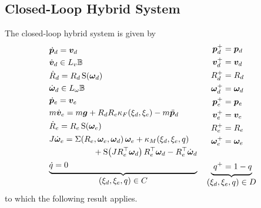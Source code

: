 \documentclass[journal]{IEEEtran}
\newcommand{\ball}{\mathbb{B}}
\begin{document}
\subsection{Closed-Loop Hybrid System}
The closed-loop hybrid system is given by
\begin{equation}\label{eq:H}
\begin{aligned}
\underbrace{%
\begin{aligned}
&\dot{\bm{p}}_d = \bm{v}_d\\
&\dot{\bm{v}}_d \in L_v\ball\\
&\dot{R}_d = R_d \operatorname{S}(\bm{\omega}_d)\\
&\dot{\bm{\omega}}_d \in L_\omega\ball\\
&\dot{\bm{p}}_e = \bm{v}_e\\
&m\dot{\bm{v}}_e = m\bm{g} + R_d R_e \kappa_F(\xi_d,\xi_e) - m\ddot{\bm{p}}_d\\
&\dot{R}_e = R_e \operatorname{S}(\bm{\omega}_e)\\
&\begin{multlined}
J\dot{\bm{\omega}}_e
= \Sigma(R_e,\bm{\omega}_e,\bm{\omega}_d)\,\bm{\omega}_e + \kappa_M(\xi_d,\xi_e,q) \\
+ \operatorname{S}\!\big(J R_e^\top \bm{\omega}_d\big)\,R_e^\top \bm{\omega}_d
- R_e^\top \dot{\bm{\omega}}_d
\end{multlined}\\
&\dot{q} = 0
\end{aligned}}_{\displaystyle(\xi_d,\xi_e,q)\in C}
\quad
\underbrace{%
\begin{aligned}
\bm{p}_d^{+} &= \bm{p}_d\\
\bm{v}_d^{+} &= \bm{v}_d\\
R_d^{+} &= R_d\\
\bm{\omega}_d^{+} &= \bm{\omega}_d\\
\bm{p}_e^{+} &= \bm{p}_e\\
\bm{v}_e^{+} &= \bm{v}_e\\
R_e^{+} &= R_e\\
\bm{\omega}_e^{+} &= \bm{\omega}_e\\
\\
q^{+} &= 1 - q
\end{aligned}}_{\displaystyle(\xi_d,\xi_e,q)\in D}
\end{aligned}
\end{equation}
to which the following result applies.
\end{document}
